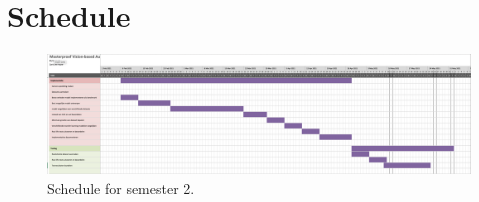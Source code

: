 \chapter{Schedule}
 \begin{figure}[hbtp]
 \centering
 \includegraphics[width=\textheight, angle=90]{fig/algemeen/planning_sem2.png}
 \caption{Schedule for semester 2.}
 \end{figure}